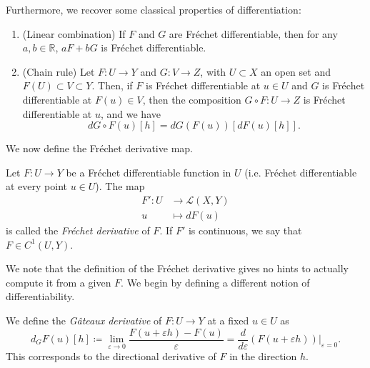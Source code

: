 Furthermore, we recover some classical properties of differentiation:
\begin{enumerate}
    \item (Linear combination) If $F$ and $G$ are Fréchet differentiable, then for any $a,b\in\mathbb{R}$, $aF+bG$ is Fréchet differentiable.
    \item (Chain rule) Let $F:U\to Y$ and $G:V\to Z$, with $U\subset X$ an open set and $F(U)\subset V\subset Y$. Then, if $F$ is Fréchet differentiable at $u\in U$ and $G$ is Fréchet differentiable at $F(u)\in V$, then the composition $G\circ F:U\to Z$ is Fréchet differentiable at $u$, and we have
    \begin{equation*}
        dG\circ F(u)[h] = dG(F(u))[dF(u)[h]].
    \end{equation*}
\end{enumerate}

We now define the Fréchet derivative map.
\begin{definition}
    Let $F:U\to Y$ be a Fréchet differentiable function in $U$ (i.e. Fréchet differentiable at every point $u\in U$). The map
    \begin{equation}
        \begin{aligned}
            F':U &\to \mathcal{L}(X,Y)\\
            u &\mapsto dF(u)
        \end{aligned}
    \end{equation}
    is called the \emph{Fréchet derivative} of $F$. If $F'$ is continuous, we say that $F\in C^1(U,Y)$.
\end{definition}

We note that the definition of the Fréchet derivative gives no hints to actually compute it from a given $F$. We begin by defining a different notion of differentiability.
\begin{definition}
    We define the \emph{Gâteaux derivative} of $F:U\to Y$ at a fixed $u\in U$ as
    \begin{equation}\label{eq:gateaux-derivative}
        d_G F(u)[h] \coloneqq \lim_{\varepsilon\to 0} \frac{F(u+\varepsilon h)-F(u)}{\varepsilon} = \frac{d}{d\varepsilon}\left.\left(F(u+\varepsilon h)\right)\right|_{\varepsilon = 0}.
    \end{equation}
    This corresponds to the directional derivative of $F$ in the direction $h$.
\end{definition}

